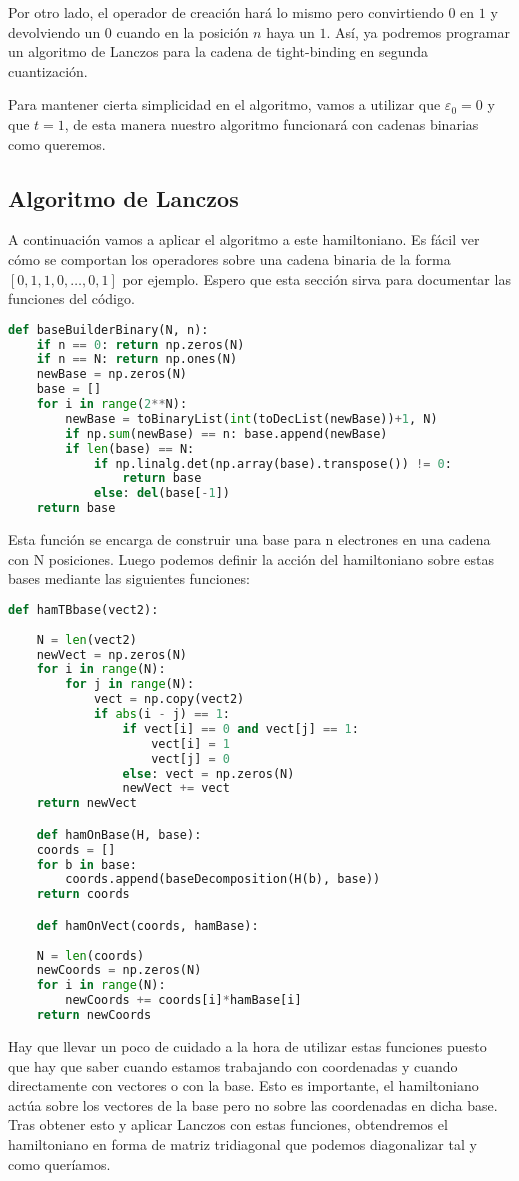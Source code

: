\documentclass{article} %
\begin{document}
Por otro lado, el operador de creación hará lo mismo pero convirtiendo $0$ en $1$ y devolviendo un $0$ cuando en la posición $n$ haya un $1$. Así, ya podremos programar un algoritmo de Lanczos para la cadena de tight-binding en segunda cuantización.

Para mantener cierta simplicidad en el algoritmo, vamos a utilizar que $\varepsilon_0 = 0$ y que $t = 1$, de esta manera nuestro algoritmo funcionará con cadenas binarias como queremos.

\subsection{Algoritmo de Lanczos}

A continuación vamos a aplicar el algoritmo a este hamiltoniano. Es fácil ver cómo se comportan los operadores sobre una cadena binaria de la forma $[0, 1, 1, 0, \ldots, 0, 1]$ por ejemplo. Espero que esta sección sirva para documentar las funciones del código.
\begin{lstlisting}[language=Python]
    def baseBuilderBinary(N, n):
    if n == 0: return np.zeros(N)
    if n == N: return np.ones(N)
    newBase = np.zeros(N)
    base = []
    for i in range(2**N):
        newBase = toBinaryList(int(toDecList(newBase))+1, N)
        if np.sum(newBase) == n: base.append(newBase)
        if len(base) == N:
            if np.linalg.det(np.array(base).transpose()) != 0:
                return base
            else: del(base[-1])
    return base
\end{lstlisting}

Esta función se encarga de construir una base para n electrones en una cadena con N posiciones. Luego podemos definir la acción del hamiltoniano sobre estas bases mediante las siguientes funciones:
\begin{lstlisting}[language=Python]
    def hamTBbase(vect2):
    
    N = len(vect2)
    newVect = np.zeros(N)
    for i in range(N):
        for j in range(N):
            vect = np.copy(vect2)
            if abs(i - j) == 1:
                if vect[i] == 0 and vect[j] == 1:
                    vect[i] = 1
                    vect[j] = 0
                else: vect = np.zeros(N)
                newVect += vect 
    return newVect

    def hamOnBase(H, base):
    coords = []
    for b in base:
        coords.append(baseDecomposition(H(b), base))
    return coords

    def hamOnVect(coords, hamBase):
    
    N = len(coords)
    newCoords = np.zeros(N)
    for i in range(N):
        newCoords += coords[i]*hamBase[i]
    return newCoords
\end{lstlisting}

Hay que llevar un poco de cuidado a la hora de utilizar estas funciones puesto que hay que saber cuando estamos trabajando con coordenadas y cuando directamente con vectores o con la base. Esto es importante, el hamiltoniano actúa sobre los vectores de la base pero no sobre las coordenadas en dicha base. Tras obtener esto y aplicar Lanczos con estas funciones, obtendremos el hamiltoniano en forma de matriz tridiagonal que podemos diagonalizar tal y como queríamos.
\printbibliography
\end{document}
